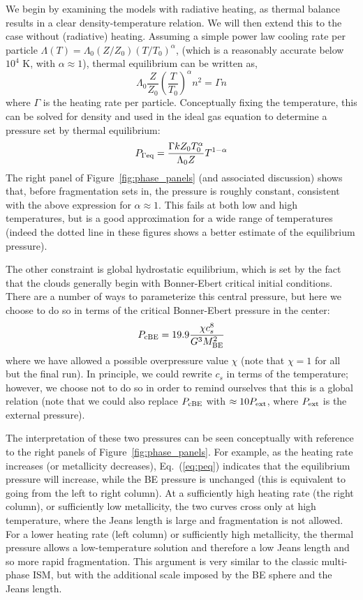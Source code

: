 \documentclass[useAMS,usenatbib]{mn2e}
\begin{document}
We begin by examining the models with radiative heating, as thermal balance results in a clear density-temperature relation.  We will then extend this to the case without (radiative) heating.  Assuming a simple power law cooling rate per particle $\Lambda(T) = \Lambda_0 (Z/Z_0) (T/T_0)^{\alpha}$, (which is a reasonably accurate below $10^4$ K, with $\alpha \approx 1$), thermal equilibrium can be written as,
\begin{equation}
\Lambda_0 \frac{Z}{Z_0} \left( \frac{T}{T_0} \right)^{\alpha} n^2 = \Gamma n
\label{eq:thermal_eq}
\end{equation}
where $\Gamma$ is the heating rate per particle.  Conceptually fixing the temperature, this can be solved for density and used in the ideal gas equation to determine a pressure set by thermal equilibrium:
\begin{equation}
P_{\Gamma \rm eq} = \frac{\Gamma k Z_0 T_0^{\alpha}}{\Lambda_0 Z} T^{1-\alpha}
\label{eq:peq}
\end{equation}
The right panel of Figure~\ref{fig:phase_panels} (and associated discussion) shows that, before fragmentation sets in, the pressure is roughly constant, consistent with the above expression for $\alpha \approx 1$.  This fails at both low and high temperatures, but is a good approximation for a wide range of temperatures (indeed the dotted line in these figures shows a better estimate of the equilibrium pressure).

The other constraint is global hydrostatic equilibrium, which is set by the fact that the clouds generally begin with Bonner-Ebert critical initial conditions.  There are a number of ways to parameterize this central pressure, but here we choose to do so in terms of the critical Bonner-Ebert pressure in the center:
\begin{equation}
P_{\rm cBE} = 19.9 \frac{\chi c_s^8}{G^3 M_{\rm BE}^2}
\end{equation}
where we have allowed a possible overpressure value $\chi$ (note that $\chi = 1$ for all but the final run).  In principle, we could rewrite $c_s$ in terms of the temperature; however, we choose not to do so in order to remind ourselves that this is a global relation (note that we could also replace $P_{\rm cBE}$ with $\approx 10 P_{\rm ext}$, where $P_{\rm ext}$ is the external pressure).

The interpretation of these two pressures can be seen conceptually with reference to the right panels of Figure~\ref{fig:phase_panels}.  For example, as the heating rate increases (or metallicity decreases), Eq.~(\ref{eq:peq}) indicates that the equilibrium pressure will increase, while the BE pressure is unchanged (this is equivalent to going from the left to right column).  At a sufficiently high heating rate (the right column), or sufficiently low metallicity, the two curves cross only at high temperature, where the Jeans length is large and fragmentation is not allowed.  For a lower heating rate (left column) or sufficiently high metallicity, the thermal pressure allows a low-temperature solution and therefore a low Jeans length and so more rapid fragmentation.  This argument is very similar to the classic multi-phase ISM, but with the additional scale imposed by the BE sphere and the Jeans length.
\end{document}
